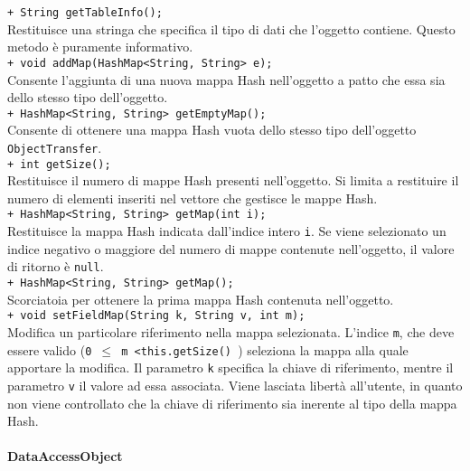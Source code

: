 {\begin{sloppypar}
{{{{\begin{itemize}
{				\texttt{+ String getTableInfo();}\\
				Restituisce una stringa che specifica il tipo di dati che l'oggetto contiene.
				Questo metodo è puramente informativo.\\
				
				\texttt{+ void addMap(HashMap<String, String> e);}\\
				Consente l'aggiunta di una nuova mappa Hash nell'oggetto a patto che essa sia dello stesso tipo dell'oggetto.\\
				
				\texttt{+ HashMap<String, String> getEmptyMap();}\\
				Consente di ottenere una mappa Hash vuota dello stesso tipo dell'oggetto \texttt{ObjectTransfer}.\\
				
				\texttt{+ int getSize();}\\
				Restituisce il numero di mappe Hash presenti nell'oggetto. Si limita a restituire il numero di elementi inseriti nel vettore che gestisce le mappe Hash.\\
				
				\texttt{+ HashMap<String, String> getMap(int i);}\\
				Restituisce la mappa Hash indicata dall'indice intero \texttt{i}. Se viene selezionato un indice negativo o maggiore del numero di mappe contenute nell'oggetto, il valore di ritorno è \texttt{null}.\\
				
				\texttt{+ HashMap<String, String> getMap();}\\
				Scorciatoia per ottenere la prima mappa Hash contenuta nell'oggetto.\\
				
				\texttt{+ void setFieldMap(String k, String v, int m);}\\
				Modifica un particolare riferimento nella mappa selezionata. L'indice \texttt{m}, che deve essere valido (\texttt{0 $\leqslant$  m \textless this.getSize() }) seleziona la mappa alla quale apportare la modifica. Il parametro \texttt{k} specifica la chiave di riferimento, mentre il parametro \texttt{v} il valore ad essa associata. Viene lasciata libertà all'utente, in quanto non viene controllato che la chiave di riferimento sia inerente al tipo della mappa Hash.\\
				}
			\end{itemize}
		}%


		\paragraph{DataAccessObject}\label{par:DataAccessObject}{
			\begin{itemize}
			

\end{itemize}}}}}
\end{sloppypar}}
